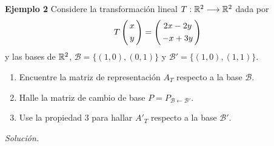 
\subsection{}
%
\begin{frame}%

\begin{ej}{\textbf{Ejemplo 2}}
	Considere la transformación lineal $T:\mathbb{R}^2\longrightarrow\mathbb{R}^2$ dada por
	\[
	T\left(
	\begin{array}{@{\hspace{0.3\tabcolsep}}c@{\hspace{0.3\tabcolsep}}}
	x  \\[1mm]
	y  
	\end{array}
	\right)
	=
	\left(
	\begin{array}{@{\hspace{0.3\tabcolsep}}c@{\hspace{0.3\tabcolsep}}}
	2x-2y  \\[1mm]
	-x+3y 
	\end{array}
	\right)
	\]
	y las bases de $\mathbb{R}^2$, $\mathcal{B}=\{(1,0), (0,1)\}$ y $\mathcal{B}'=\{(1,0), (1,1)\}$.
	
	\begin{enumerate}[$a$]
		\justifying
		\item Encuentre la matriz de representación $A_T$ respecto a la base  $\mathcal{B}$.
		\item Halle la matriz de cambio de base $P=P_{\mathcal{B} \leftarrow\mathcal{B}'}$.
		\item Use la propiedad 3 para hallar ${A'}_T$ respecto a la base $\mathcal{B}'$.
	\end{enumerate}
\end{ej}
\textit{Solución.}

\end{frame}



